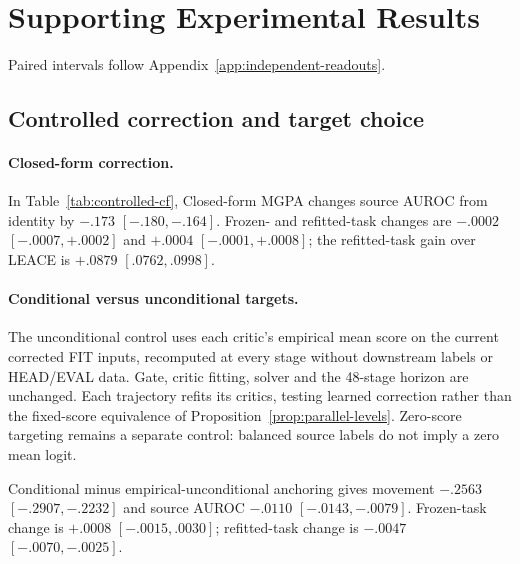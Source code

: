 \section{Supporting Experimental Results}
\label{app:retained-results}
Paired intervals follow Appendix~\ref{app:independent-readouts}.

\subsection{Controlled correction and target choice}
\label{app:closed-form-controlled}
\label{app:target-controls}
\paragraph{Closed-form correction.}
In Table~\ref{tab:controlled-cf}, Closed-form MGPA changes source AUROC from
identity by $-.173$ $[-.180,-.164]$. Frozen- and refitted-task changes are
$-.0002$ $[-.0007,+.0002]$ and $+.0004$ $[-.0001,+.0008]$;
the refitted-task gain over LEACE is $+.0879$ $[.0762,.0998]$.

\paragraph{Conditional versus unconditional targets.}
The unconditional control uses each critic's empirical mean score on the
current corrected FIT inputs, recomputed at every stage without downstream
labels or HEAD/EVAL data. Gate, critic fitting, solver and the 48-stage
horizon are unchanged. Each trajectory refits its critics, testing learned
correction rather than the fixed-score equivalence of
Proposition~\ref{prop:parallel-levels}. Zero-score targeting remains a
separate control: balanced source labels do not imply a zero mean logit.

\begin{table}[htbp]
\centering\small
\caption{\textbf{Conditional versus constant targets.}
Native controlled outputs for the same 81 participants and fits as
Figure~\ref{fig:target-cost}c. $S$: source AUROC; $T_f/T_r$: frozen/refitted
task AUROC; $M$: movement.}
\label{tab:target-controls}

\end{table}

Conditional minus empirical-unconditional anchoring gives movement
$-.2563$ $[-.2907,-.2232]$ and source AUROC $-.0110$ $[-.0143,-.0079]$.
Frozen-task change is $+.0008$ $[-.0015,.0030]$; refitted-task change is
$-.0047$ $[-.0070,-.0025]$.


